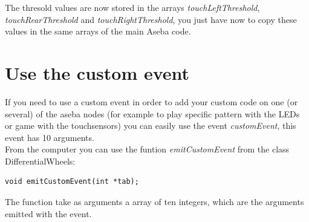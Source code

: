 \documentclass[a4paper,11pt]{report}
\begin{document}
The thresold values are now stored in the arrays \textit{touchLeftThreshold}, \textit{touchRearThreshold} and \textit{touchRightThreshold}, you just have now to copy these values in the same arrays of the main Aseba code.\\

\newpage
\section{Use the custom event}
If you need to use a custom event in order to add your custom code on one (or several) of the aseba nodes (for example to play specific pattern with the LEDs or game with the touchsensors) you can easily use the event \textit{customEvent}, this event has 10 arguments.\\

From the computer you can use the funtion \textit{emitCustomEvent} from the class DifferentialWheels:
\lstset{language=c++} 
\lstset{commentstyle=\textit} 
\begin{lstlisting} 
void emitCustomEvent(int *tab);
\end{lstlisting}
The function take as arguments a array of ten integers, which are the arguments emitted with the event.\\

\appendix
\end{document}
